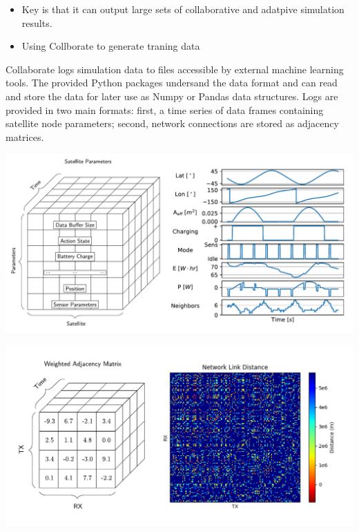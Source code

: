 \documentclass[11pt]{article}
\begin{document}
\begin{itemize}
\item Key is that it can output large sets of collaborative and adatpive simulation
results.

\item Using Collborate to generate traning data
\end{itemize}

Collaborate logs simulation data to files accessible by external machine
learning tools.  The provided Python packages undersand the data format and can
read and store the data for later use as Numpy or Pandas data structures.  Logs
are provided in two main formats: first, a time series of data frames containing
satellite node parameters; second, network connections are stored as adjacency
matrices.

\begin{center}
\includegraphics[width=\textwidth]{./images/parameters_combined.pdf}
\end{center}

\begin{center}
\includegraphics[width=\textwidth]{./images/weighted_combined.pdf}
\end{center}
\end{document}
